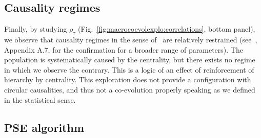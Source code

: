 \documentclass[graybox]{svmult}
\begin{document}
\subsection{Causality regimes}


Finally, by studying $\rho_{\tau}$ (Fig.~\ref{fig:macrocoevolexplo:correlations}, bottom panel), we observe that causality regimes in the sense of~\cite{raimbault2017identification} are relatively restrained (see~\cite{raimbault:tel-01857741}, Appendix A.7, for the confirmation for a broader range of parameters). The population is systematically caused by the centrality, but there exists no regime in which we observe the contrary. This is a logic of an effect of reinforcement of hierarchy by centrality. This exploration does not provide a configuration with circular causalities, and thus not a co-evolution properly speaking as we defined in the statistical sense.











\subsection{PSE algorithm}
\end{document}
